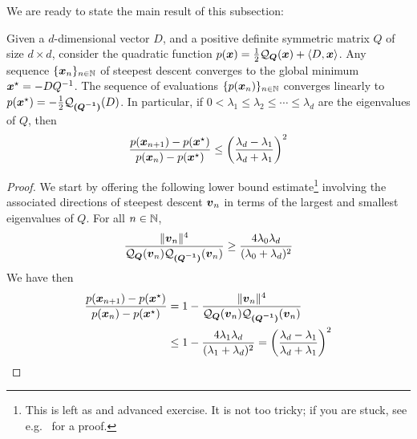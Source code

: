 We are ready to state the main result of this subsection:
\begin{theorem}\label{theorem:KantorovichEstimate}
Given a $d$-dimensional vector $D$, and a positive definite symmetric matrix $Q$ of size $d \times d$, consider the quadratic function $p(\boldsymbol{x}) = \tfrac{1}{2}\mathcal{Q}_{\boldsymbol{Q}}(\boldsymbol{x}) + \langle D , \boldsymbol{x} \rangle$.  Any sequence $\{ \boldsymbol{x}_n \}_{n \in \mathbb{N}}$ of steepest descent converges to the global minimum $\boldsymbol{x}^{\star} = -DQ^{-1}$.  The sequence of evaluations $\{ p(\boldsymbol{x}_n) \}_{n \in \mathbb{N}}$ converges linearly to $p(\boldsymbol{x}^{\star}) = -\tfrac{1}{2}\mathcal{Q}_{\boldsymbol{(Q^{-1})}}(D)$.  In particular, if $0 < \lambda_1 \leq \lambda_2 \leq \dotsb \leq \lambda_d$ are the eigenvalues of $Q$, then 
\begin{equation*}
\frac{p(\boldsymbol{x}_{n+1}) - p(\boldsymbol{x}^{\star})}{p(\boldsymbol{x}_n)- p(\boldsymbol{x}^{\star})} \leq \bigg( \frac{\lambda_d -\lambda_1}{\lambda_d + \lambda_1} \bigg)^2
\end{equation*}
\end{theorem}
\begin{proof}
We start by offering the following lower bound estimate\footnote{This is left as and advanced exercise. It is not too tricky; if you are stuck, see e.g.~\cite[section 1.3.1]{bertsekas1999nonlinear} for a proof.} involving the associated directions of steepest descent $\boldsymbol{v}_n$ in terms of the largest and smallest eigenvalues of $Q$.  For all $n \in \mathbb{N}$,
\begin{equation}\label{equation:KantorovichEstimate}\index{Theorem!Kantorovich estimate}
\frac{\norm{\v_n}^4}{\quadratic{Q}(\v_n) \quadratic{(Q^{-1})}(\v_n)} \geq \frac{4\lambda_0\lambda_d}{(\lambda_0 + \lambda_d)^2}
\end{equation}
We have then
\begin{align*}
\frac{p(\boldsymbol{x}_{n+1}) - p(\boldsymbol{x}^{\star})}{p(\boldsymbol{x}_n)- p(\boldsymbol{x}^{\star})} &= 1 - \frac{\lVert \boldsymbol{v}_n \rVert^4}{ \mathcal{Q}_{\boldsymbol{Q}}(\boldsymbol{v}_n) \mathcal{Q}_{\boldsymbol{(Q^{-1})}}(\boldsymbol{v}_n) } \\
&\leq 1 - \frac{4\lambda_1 \lambda_d}{(\lambda_1 + \lambda_d)^2} = \bigg( \frac{\lambda_d - \lambda_1}{\lambda_d + \lambda_1} \bigg)^2 \qedhere
\end{align*}
\end{proof}

